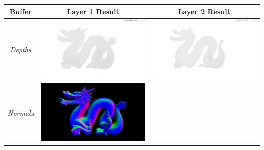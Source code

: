 \begin{table}[!ht]
\centering
\begin{tabular}{| c | c | c |}
\hline
Buffer & Layer 1 Result & Layer 2 Result \\
\hline
\emph{Depths} &
\includegraphics[scale=0.1,trim=0 0 0 -5]{img/results/g-buffer/depths-2layer-1} &
\includegraphics[scale=0.1,trim=0 0 0 -5]{img/results/g-buffer/depths-2layer-2} \\
\hline
\emph{Normals} &
\includegraphics[scale=0.1,trim=0 0 0 -5]{img/results/g-buffer/normals-2layer-1} &

\end{tabular}
\end{table}
